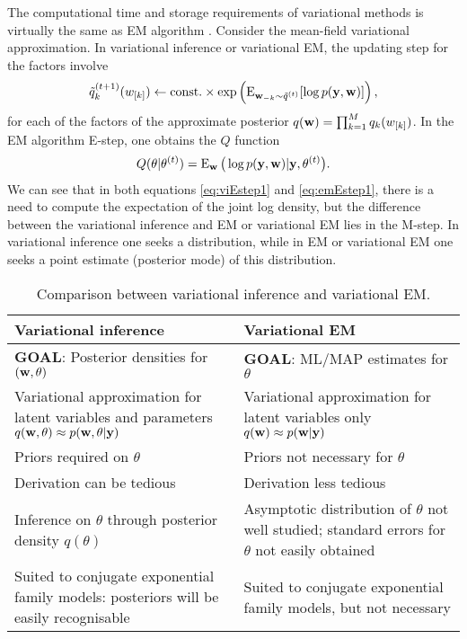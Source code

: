 The computational time and storage requirements of variational methods is virtually the same as EM algorithm \citep{beal2003variational,blei2017variational}.
Consider the mean-field variational approximation.
In variational inference or variational EM, the updating step for the factors involve
\begin{equation}\label{eq:viEstep1}
  \tilde q_k^{(t+1)}(w_{[k]}) \gets \text{const.}\hspace{0.01em} \times \exp \left( \operatorname{E}_{{\mathbf w}_{-k}\sim\tilde q^{(t)}}[\log p({\mathbf y},{\mathbf w})]\right),
\end{equation}
for each of the factors of the approximate posterior $q({\mathbf w}) = \prod_{k=1}^M q_k(w_{[k]})$.
In the EM algorithm E-step, one obtains the $Q$ function
\begin{equation}\label{eq:emEstep1}
  Q(\theta|\theta^{(t)}) = \operatorname{E}_{{\mathbf w}}\big( \log p({\mathbf y},{\mathbf w})|{\mathbf y},\theta^{(t)} \big).
\end{equation}
We can see that in both equations \cref{eq:viEstep1} and \cref{eq:emEstep1}, there is a need to compute the expectation of the joint log density, but the difference between the variational inference and EM or variational EM lies in the M-step.
In variational inference one seeks a distribution, while in EM or variational EM one seeks a point estimate (posterior mode) of this distribution.

{\renewcommand{\arraystretch}{1.5}
\begin{table}[]
\centering
\caption{Comparison between variational inference and variational EM.}
\label{tab:vivemcompare}
\begin{tabular}{p{6.5cm}p{6.5cm}}
\toprule
Variational inference & Variational EM\\ 
\midrule
\textbf{GOAL}: Posterior densities for $({\mathbf w}, \theta)$                                                          
& \textbf{GOAL}: ML/MAP estimates for $\theta$ \\
Variational approximation for latent variables and parameters $q({\mathbf w},\theta)\approx p({\mathbf w},\theta|{\mathbf y})$ 
& Variational approximation for latent variables only $q({\mathbf w})\approx p({\mathbf w}|{\mathbf y})$ \\
Priors required on $\theta$                                                                            
& Priors not necessary for $\theta$ \\
Derivation can be tedious 
& Derivation less tedious \\
Inference on $\theta$ through posterior density $q(\theta)$
& Asymptotic distribution of $\theta$ not well studied; standard errors for $\theta$ not easily obtained \\
Suited to conjugate exponential family models: posteriors will be easily recognisable
& Suited to conjugate exponential family models, but not necessary \\
\bottomrule
\end{tabular}
\end{table}
}

